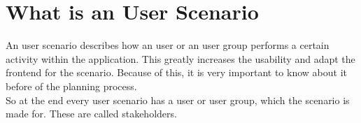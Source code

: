 \section{What is an User Scenario}
An user scenario describes how an user or an user group performs a certain activity within the application. This greatly increases the usability and adapt the frontend for the scenario. Because of this, it is very important to know about it before of the planning process.
\\[10pt]
So at the end every user scenario has a user or user group, which the scenario is made for. These are called stakeholders.
